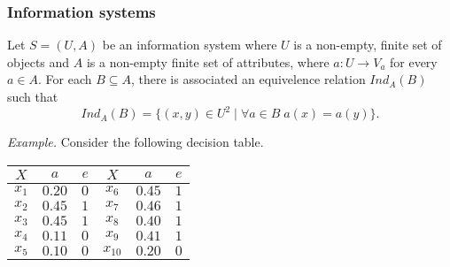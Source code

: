\documentclass[envcountsect]{beamer}
\begin{document}
\begin{frame}
	\frametitle{Information systems}

	Let $S=(U,A)$ be an information system where $U$ is a non-empty, finite set of objects and $A$ is a non-empty
	finite set of attributes, where $a: U \rightarrow V_a$ for every $a \in A$. For each $B \subseteq A$, there is associated an equivelence relation $Ind_A(B)$ such that
$$	
		Ind_A(B)= \{(x,y)\in U^2 \; | \; \forall a \in B \; a(x) = a(y)\}.
$$

	\emph{Example.} Consider the following decision table.

\begin{table}
	\begin{tabular}{cccccc}
		\hline 
		$X$& $a$& $e$& $X$& $a$& $e$\\
		\hline
		$x_1$ & $0.20$ & $0$&  $x_6$ & $0.45$ & $1$ \\
		$x_2$ & $0.45$ & $1$ & $x_7$ & $0.46$ & $1$ \\
		$x_3$ & $0.45$ & $1$ & $x_8$ & $0.40$ & $1$  \\
		$x_4$ & $0.11$ & $0$ & $x_9$ & $0.41$ & $1$ \\
		$x_5$ & $0.10$ & $0$ & $x_{10}$ & $0.20$ & $0$\\
		\hline
	\end{tabular}
\end{table}

\end{frame}
\end{document}
